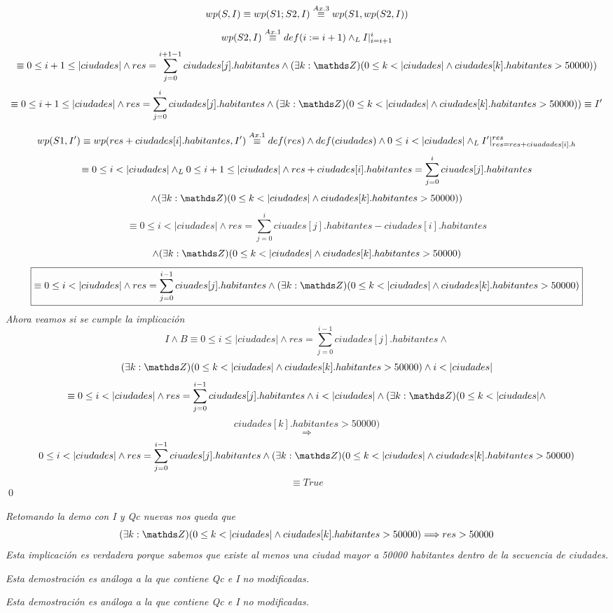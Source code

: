 \documentclass[10pt,a4paper]{article}
\begin{document}
	\begin{demo2}
		
		
		\[
		wp(S,I) \equiv wp(S1;S2,I) \overset{\scriptsize Ax. 3}{\equiv}wp(S1,wp(S2,I))
		\]
		\[ 	wp(S2,I) \overset{\scriptsize Ax. 1}{\equiv} def(i:=i+1) \land _L I|_{i=i+1}^{i}
		\]	
		\[ \equiv 0\leq i+1 \leq |ciudades| \land res=\sum_{j=0}^{i+1-1} ciudades[j].habitantes\land (\exists k: \ent)(0 \leq k < |ciudades| \land 
		ciudades[k].habitantes > 50000))\]
		\[\equiv 0\leq i+1\leq |ciudades| \land res=\sum_{j=0}^{i} ciudades[j].habitantes \land (\exists k: \ent)(0 \leq k < |ciudades| \land 
		ciudades[k].habitantes > 50000))\equiv I'\]\par
		
		\[wp(S1,I') \equiv wp(res+ciudades[i].habitantes,I')\overset{\scriptsize Ax. 1}{\equiv} def(res) \land def(ciudades) \land 0 \leq i < |ciudades| \land _L I'|_{res=res+ciuadades[i].h}^{res}\]
		\[
		\equiv 0 \leq i <|ciudades| \yLuego 0\leq i+1 \leq |ciudades|\land res+ ciudades[i].habitantes=\sum_{j=0}^{i} ciuades[j].habitantes 
		\]
		\[\land(\exists k: \ent)(0 \leq k < |ciudades| \land ciudades[k].habitantes > 50000))\]
		\[\equiv 0 \leq i < |ciudades| \land res=\sum_{j=0}^{i} ciuades[j].habitantes -ciudades[i].habitantes \]
		\[\land (\exists k: \ent)(0 \leq k < |ciudades| \land ciudades[k].habitantes > 50000) \]
		\[
		\boxed{	\equiv 0 \leq i < |ciudades| \land res=\sum_{j=0}^{i-1} ciuades[j].habitantes \land (\exists k: \ent)(0 \leq k < |ciudades| \land ciudades[k].habitantes > 50000)}
		\]
		\textit{Ahora veamos si se cumple la implicación}
		\[
		I \land B \equiv 0 \leq i \leq |ciudades| \land res= \sum_{j=0}^{i-1} ciudades[j].habitantes \land \]
		\[(\exists k: \ent)(0 \leq k < |ciudades| \land ciudades[k].habitantes > 50000) \land i < \lvert ciudades \rvert 
		\]
		\[\equiv  0 \leq i < |ciudades| \land res= \sum_{j=0}^{i-1} ciudades[j].habitantes \land  i < \lvert ciudades \rvert \land (\exists k: \ent)(0 \leq k < |ciudades| \land\]
		\[ ciudades[k].habitantes > 50000) \]
		\[\Longrightarrow\]
		\[ 0 \leq i < |ciudades| \land res=\sum_{j=0}^{i-1} ciuades[j].habitantes \land (\exists k: \ent)(0 \leq k < |ciudades| \land ciudades[k].habitantes > 50000) \] 
		\[\equiv True\]
		\qed 
		
	\end{demo2}
	
	\begin{demo3}
		\noindent
		\textit{Retomando la demo con I y Qc nuevas nos queda que}
		\[(\exists k: \ent)(0 \leq k < |ciudades| \land ciudades[k].habitantes > 50000) \Longrightarrow res>50000\]
		\textit{Esta implicación es verdadera porque sabemos que existe al menos una ciudad mayor a 50000 habitantes dentro de la secuencia de ciudades.}
	\end{demo3}
	
	\begin{demo4}
		\textit{Esta demostración es análoga a la que contiene Qc e I no modificadas.}
	\end{demo4}
	
	\begin{demo5}
		
		\noindent \textit{Esta demostración es análoga a la que contiene Qc e I no modificadas.}
	\end{demo5}
	
\end{document}
